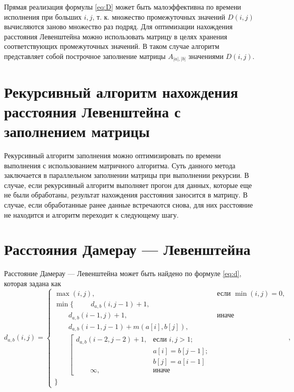         Прямая реализация формулы \ref{eq:D} может быть малоэффективна по времени исполнения при больших $i, j$, т. к. множество промежуточных значений $D(i, j)$ вычисляются заново множество раз подряд. Для оптимизации нахождения расстояния Левенштейна можно использовать матрицу в целях хранения соответствующих промежуточных значений. В таком случае алгоритм представляет собой построчное заполнение матрицы 
        $A_{|a|,|b|}$ значениями $D(i, j)$.
    
    \section{Рекурсивный алгоритм нахождения расстояния Левенштейна с заполнением матрицы}
        \label{sec:recmat}
        
        Рекурсивный алгоритм заполнения можно оптимизировать по времени выполнения с использованием матричного алгоритма. Суть данного метода заключается в параллельном заполнении матрицы при выполнении рекурсии. В случае, если рекурсивный алгоритм выполняет прогон для данных, которые еще не были обработаны, результат нахождения расстояния заносится в матрицу. В случае, если обработанные ранее данные встречаются снова, для них расстояние не находится и алгоритм переходит к следующему шагу.
    
    \section{Расстояния Дамерау — Левенштейна}
    
        Расстояние Дамерау — Левенштейна может быть найдено по формуле \ref{eq:d}, которая задана как
        \begin{equation}
        	\label{eq:d}
        	d_{a,b}(i, j) = \begin{cases}
        		\max(i, j), &\text{если }\min(i, j) = 0,\\
        		\min \lbrace \      \
        			\qquad d_{a,b}(i, j-1) + 1,\\
        			\qquad d_{a,b}(i-1, j) + 1, &\text{иначе}\\
        			\qquad d_{a,b}(i-1, j-1) + m(a[i], b[j]),\\
        			\qquad \left[ \begin{array}{cc}d_{a,b}(i-2, j-2) + 1, &\text{если }i,j > 1;\\
        			\qquad &\text{}a[i] = b[j-1]; \\
        			\qquad &\text{}b[j] = a[i-1]\\
        			\qquad \infty, & \text{иначе}\end{array}\right.\\
        		\rbrace
        		\end{cases},
        \end{equation}
        

